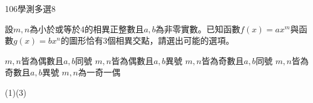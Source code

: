     \begin{QUESTION}
        \begin{ExamInfo}{106}{學測}{多選}{8}
        \end{ExamInfo}
        \begin{ExamAnsRateInfo}{24}{35}{20}{17}
        \end{ExamAnsRateInfo}
        \begin{QBODY}
            設$m,n$為小於或等於4的相異正整數且$a,b$為非零實數。已知函數$f(x)=a{{x}^{m}}$與函數$g(x)=b{{x}^{n}}$的圖形恰有3個相異交點，請選出可能的選項。
			\begin{QOPS}
			\QOP $m,n$皆為偶數且$a,b$同號 
			\QOP $m,n$皆為偶數且$a,b$異號
			\QOP $m,n$皆為奇數且$a,b$同號
			\QOP $m,n$皆為奇數且$a,b$異號
			\QOP $m,n$為一奇一偶
			\end{QOPS}
        \end{QBODY}
        \begin{QFROMS}
        \end{QFROMS}
        \begin{QTAGS}\end{QTAGS}
        \begin{QANS}
            (1)(3)
        \end{QANS}
        \begin{QSOLLIST}
        \end{QSOLLIST}
        \begin{QEMPTYSPACE}
        \end{QEMPTYSPACE}
    \end{QUESTION}
